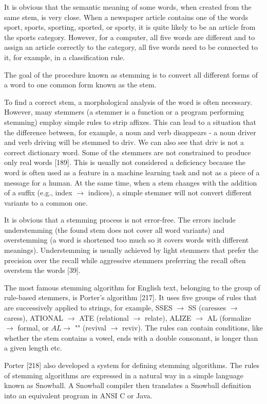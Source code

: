 \documentclass[10pt]{book}
\begin{document}
It is obvious that the semantic meaning of some words, when created from the same stem, is very close. When a newspaper article contains one of the words sport, sports, sporting, sported, or sporty, it is quite likely to be an article from the sports category. However, for a computer, all five words are different and to assign an article correctly to the category, all five words need to be connected to it, for example, in a classification rule.

The goal of the procedure known as stemming is to convert all different forms of a word to one common form known as the stem.

To find a correct stem, a morphological analysis of the word is often necessary. However, many stemmers (a stemmer is a function or a program performing stemming) employ simple rules to strip affixes. This can lead to a situation that the difference between, for example, a noun and verb disappears - a noun driver and verb driving will be stemmed to driv. We can also see that driv is not a correct dictionary word. Some of the stemmers are not constrained to produce only real words [189]. This is usually not considered a deficiency because the word is often used as a feature in a machine learning task and not as a piece of a message for a human. At the same time, when a stem changes with the addition of a suffix (e.g., index $\rightarrow$ indices), a simple stemmer will not convert different variants to a common one.

It is obvious that a stemming process is not error-free. The errors include understemming (the found stem does not cover all word variants) and overstemming (a word is shortened too much so it covers words with different meanings). Understemming is usually achieved by light stemmers that prefer the precision over the recall while aggressive stemmers preferring the recall often overstem the words [39].

The most famous stemming algorithm for English text, belonging to the group of rule-based stemmers, is Porter's algorithm [217]. It uses five groups of rules that are successively applied to strings, for example, SSES $\rightarrow$ SS (caresses $\rightarrow$ caress), ATIONAL $\rightarrow$ ATE (relational $\rightarrow$ relate), ALIZE $\rightarrow$ AL (formalize $\rightarrow$ formal, or $A L \rightarrow$ "" (revival $\rightarrow$ reviv). The rules can contain conditions, like whether the stem contains a vowel, ends with a double consonant, is longer than a given length etc.

Porter [218] also developed a system for defining stemming algorithms. The rules of stemming algorithms are expressed in a natural way in a simple language known as Snowball. A Snowball compiler then translates a Snowball definition into an equivalent program in ANSI C or Java.
\end{document}
